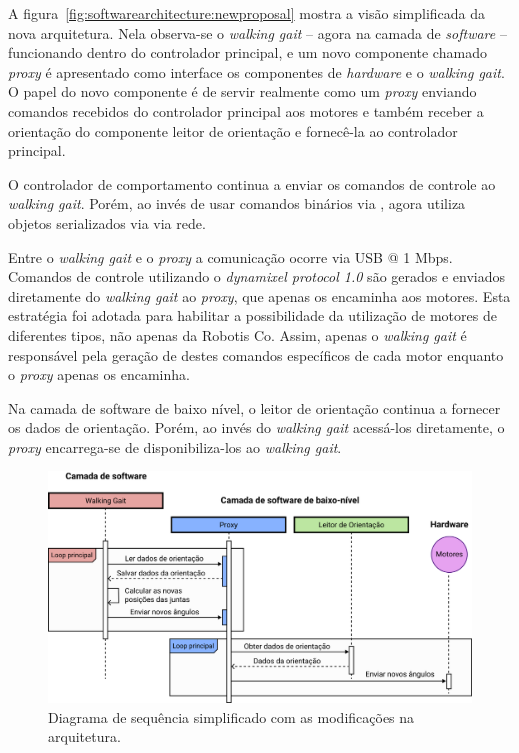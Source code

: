 A figura~\ref{fig:softwarearchitecture:newproposal} mostra a visão simplificada da nova arquitetura. Nela observa-se o \textit{walking gait} -- agora na camada de \textit{software} -- funcionando dentro do controlador principal, e um novo componente chamado \textit{proxy} é apresentado como interface os componentes de \textit{hardware} e o \textit{walking gait}. O papel do novo componente é de servir realmente como um \textit{proxy} enviando comandos recebidos do controlador principal aos motores e também receber a orientação do componente leitor de orientação e fornecê-la ao controlador principal.

O controlador de comportamento continua a enviar os comandos de controle ao \textit{walking gait}. Porém, ao invés de usar comandos binários via , agora utiliza objetos serializados via via rede.

Entre o \textit{walking gait} e o \textit{proxy} a comunicação ocorre via USB @ 1 Mbps. Comandos de controle utilizando o \textit{dynamixel protocol 1.0} são gerados e enviados diretamente do \textit{walking gait} ao \textit{proxy}, que apenas os encaminha aos motores. Esta estratégia foi adotada para habilitar a possibilidade da utilização de motores de diferentes tipos, não apenas da Robotis Co. Assim, apenas o \textit{walking gait} é responsável pela geração de destes comandos específicos de cada motor enquanto o \textit{proxy} apenas os encaminha.

Na camada de software de baixo nível, o leitor de orientação continua a fornecer os dados de orientação. Porém, ao invés do \textit{walking gait} acessá-los diretamente, o \textit{proxy} encarrega-se de disponibiliza-los ao \textit{walking gait}.

\begin{figure}[h!]
	\centering
	\includegraphics[scale=1]{imagens/svg/softwarearchitecture-newproposal-sequence}
	\caption{Diagrama de sequência simplificado com as modificações na arquitetura.}
	\label{fig:softwarearchitecture:newproposal:sequence}
\end{figure}

